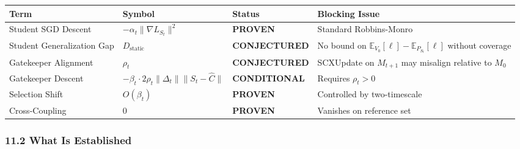\documentclass[
  12pt,
]{ctexart}
\begin{document}
\begin{longtable}[]{@{}
  >{\raggedright\arraybackslash}p{}
  >{\raggedright\arraybackslash}p{}
  >{\raggedright\arraybackslash}p{}
  >{\raggedright\arraybackslash}p{}@{}}
\toprule\noalign{}
\begin{minipage}[b]{\linewidth}\raggedright
Term
\end{minipage} & \begin{minipage}[b]{\linewidth}\raggedright
Symbol
\end{minipage} & \begin{minipage}[b]{\linewidth}\raggedright
Status
\end{minipage} & \begin{minipage}[b]{\linewidth}\raggedright
Blocking Issue
\end{minipage} \\
\midrule\noalign{}
\endhead
\bottomrule\noalign{}
\endlastfoot
Student SGD Descent & \(-\alpha_t \|\nabla L_{S_t}\|^2\) &
\textbf{PROVEN} & Standard Robbins-Monro \\
Student Generalization Gap & \(D_{\text{static}}\) &
\textbf{CONJECTURED} & No bound on
\(\mathbb{E}_{V_0}[\ell] - \mathbb{E}_{P_{S_t}}[\ell]\) without
coverage \\
Gatekeeper Alignment & \(\rho_t\) & \textbf{CONJECTURED} & SCXUpdate on
\(M_{t+1}\) may misalign relative to \(M_0\) \\
Gatekeeper Descent &
\(-\beta_t \cdot 2\rho_t \|\Delta_t\| \|S_t - \hat{C}\|\) &
\textbf{CONDITIONAL} & Requires \(\rho_t > 0\) \\
Selection Shift & \(O(\beta_t)\) & \textbf{PROVEN} & Controlled by
two-timescale \\
Cross-Coupling & \(0\) & \textbf{PROVEN} & Vanishes on reference set \\
\end{longtable}

\subsubsection{11.2 What Is Established}\label{what-is-established}
\end{document}
